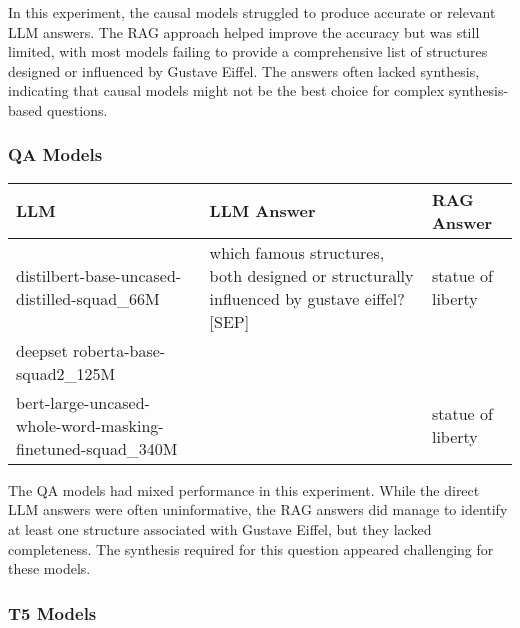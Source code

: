 \documentclass[11pt]{wseas}
\begin{document}
In this experiment, the causal models struggled to produce accurate or
relevant LLM answers. The RAG approach helped improve the accuracy but
was still limited, with most models failing to provide a comprehensive
list of structures designed or influenced by Gustave Eiffel. The answers
often lacked synthesis, indicating that causal models might not be the
best choice for complex synthesis-based questions.

\newpage

\subsubsection{QA Models}\label{qa-models}

\begin{longtable}[]{@{}
  >{\raggedright\arraybackslash}p{}
  >{\raggedright\arraybackslash}p{}
  >{\raggedright\arraybackslash}p{}@{}}
\toprule\noalign{}
\begin{minipage}[b]{\linewidth}\raggedright
LLM
\end{minipage} & \begin{minipage}[b]{\linewidth}\raggedright
LLM Answer
\end{minipage} & \begin{minipage}[b]{\linewidth}\raggedright
RAG Answer
\end{minipage} \\
\midrule\noalign{}
\endhead
\bottomrule\noalign{}
\endlastfoot
distilbert-base-uncased-distilled-squad\_66M & which famous structures,
both designed or structurally influenced by gustave eiffel? {[}SEP{]} &
statue of liberty \\
deepset roberta-base-squad2\_125M & & \\
bert-large-uncased-whole-word-masking-finetuned-squad\_340M & & statue
of liberty \\
\end{longtable}

The QA models had mixed performance in this experiment. While the direct
LLM answers were often uninformative, the RAG answers did manage to
identify at least one structure associated with Gustave Eiffel, but they
lacked completeness. The synthesis required for this question appeared
challenging for these models.

\subsubsection{T5 Models}\label{t5-models}
\end{document}
